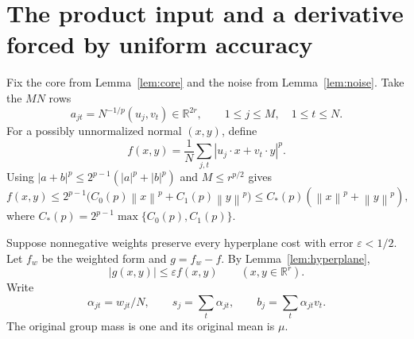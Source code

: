 \documentclass[11pt,letterpaper]{article}
\theoremstyle{definition}
\theoremstyle{remark}
\numberwithin{equation}{section}
\newcommand{\R}{\mathbb R}
\newcommand{\eps}{\varepsilon}
\newcommand{\norm}[1]{\left\lVert#1\right\rVert}
\begin{document}
\section{The product input and a derivative forced by uniform accuracy}\label{sec:product}
Fix the core from Lemma~\ref{lem:core} and the noise from Lemma~\ref{lem:noise}. Take the $MN$ rows
\begin{equation}\label{eq:rows}
 a_{jt}=N^{-1/p}(u_j,v_t)\in\R^{2r},
 \qquad 1\le j\le M,\quad1\le t\le N.
\end{equation}
For a possibly unnormalized normal $(x,y)$, define
\begin{equation}\label{eq:form}
 f(x,y)=\frac1N\sum_{j,t}|u_j\cdot x+v_t\cdot y|^p.
\end{equation}
Using $|a+b|^p\le2^{p-1}(|a|^p+|b|^p)$ and $M\le r^{p/2}$ gives
\begin{equation}\label{eq:costupper}
 f(x,y)\le2^{p-1}\bigl(C_0(p)\norm{x}^p+C_1(p)\norm{y}^p\bigr)
 \le C_*(p)(\norm{x}^p+\norm{y}^p),
\end{equation}
where $C_*(p)=2^{p-1}\max\{C_0(p),C_1(p)\}$.

Suppose nonnegative weights preserve every hyperplane cost with error $\eps<1/2$. Let $f_w$ be the weighted form and $g=f_w-f$. By Lemma~\ref{lem:hyperplane},
\begin{equation}\label{eq:uniformg}
 |g(x,y)|\le\eps f(x,y)\qquad(x,y\in\R^r).
\end{equation}
Write
\begin{equation}\label{eq:groups}
 \alpha_{jt}=w_{jt}/N,\qquad s_j=\sum_t\alpha_{jt},\qquad
 b_j=\sum_t\alpha_{jt}v_t.
\end{equation}
The original group mass is one and its original mean is $\mu$.
\end{document}
